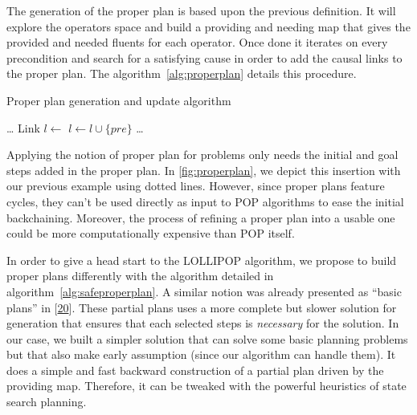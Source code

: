 The generation of the proper plan is based upon the previous definition.
It will explore the operators space and build a providing and needing
map that gives the provided and needed fluents for each operator. Once
done it iterates on every precondition and search for a satisfying cause
in order to add the causal links to the proper plan. The
algorithm~\ref{alg:properplan} details this procedure.

\begin{algorithm}\caption{Proper plan generation and update algorithm}\label{alg:properplan}\begin{algorithmic}[1]

\footnotesize
{} \State {}
 
\State {} \EndIf
\EndFunction
{} 
\State {} \EndFor
 \State \ldots{} 
\EndFunction
{} 
 
\State Link \(l \gets\) 
 \State \(l \gets l \cup \{pre\}\)
 \EndFor
 \EndIf
 \EndFor
 \State \ldots{} 
\EndFunction

\end{algorithmic}\end{algorithm}

Applying the notion of proper plan for problems only needs the initial
and goal steps added in the proper plan. In \cref{fig:properplan}, we
depict this insertion with our previous example using dotted lines.
However, since proper plans feature cycles, they can't be used directly
as input to POP algorithms to ease the initial backchaining. Moreover,
the process of refining a proper plan into a usable one could be more
computationally expensive than POP itself.

In order to give a head start to the LOLLIPOP algorithm, we propose to
build proper plans differently with the algorithm detailed in
algorithm~\ref{alg:safeproperplan}. A similar notion was already
presented as ``basic plans'' in
{[}\protect\hyperlink{ref-sebastiaux5fgraph-basedux5f2000}{20}{]}. These
partial plans uses a more complete but slower solution for generation
that ensures that each selected steps is \emph{necessary} for the
solution. In our case, we built a simpler solution that can solve some
basic planning problems but that also make early assumption (since our
algorithm can handle them). It does a simple and fast backward
construction of a partial plan driven by the providing map. Therefore,
it can be tweaked with the powerful heuristics of state search planning.

